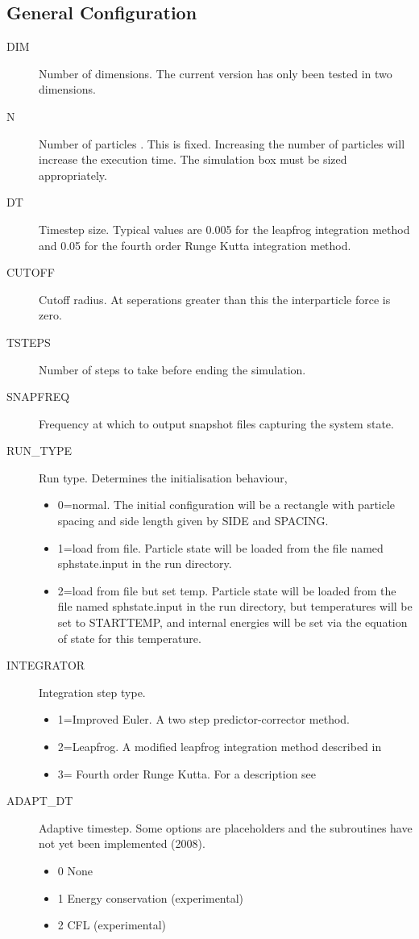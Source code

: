 \subsection{General Configuration}
\begin{description}
\item[DIM] Number of dimensions. The current version has only been tested in
    two dimensions.
\item[N] Number of particles . This is fixed. Increasing the number of
    particles will increase the execution time. The simulation box must be sized
    appropriately.
\item[DT] Timestep size. Typical values are 0.005 for the leapfrog integration
    method and 0.05 for the fourth order Runge Kutta integration method.
\item[CUTOFF] Cutoff radius. At seperations greater than this the interparticle
    force is zero.
\item[TSTEPS] Number of steps to take before ending the simulation.
\item[SNAPFREQ] Frequency at which to output snapshot files capturing the
    system state.
\item[RUN\_TYPE] Run type. Determines the initialisation behaviour,
    \begin{itemize}
    \item  0=normal. The initial configuration will be a rectangle with
        particle spacing and side length given by SIDE and SPACING.   
    \item 1=load from file. Particle state will be loaded from the file named
        sphstate.input in the run directory.
    \item  2=load from file but set temp. Particle state will be loaded from
        the file named sphstate.input in the run directory, but temperatures
        will be set to STARTTEMP, and internal energies will be set via the
        equation of state for this temperature.
    \end{itemize}
\item[INTEGRATOR] Integration step type.
    \begin{itemize}
    \item 1=Improved Euler. A two step predictor-corrector method.     
    \item 2=Leapfrog. A modified leapfrog integration method described in
        \cite[]{melean_sph_2004}       
    \item 3= Fourth order Runge Kutta. For a description see
        \cite[]{hoover_smooth_2006}
    \end{itemize}
\item[ADAPT\_DT] Adaptive timestep. Some options are placeholders and the
    subroutines have not yet been implemented (2008).
    \begin{itemize}
    \item 0 None     
    \item 1 Energy conservation (experimental)
    \item 2 CFL (experimental)
     \end{itemize}   


\end{description}
